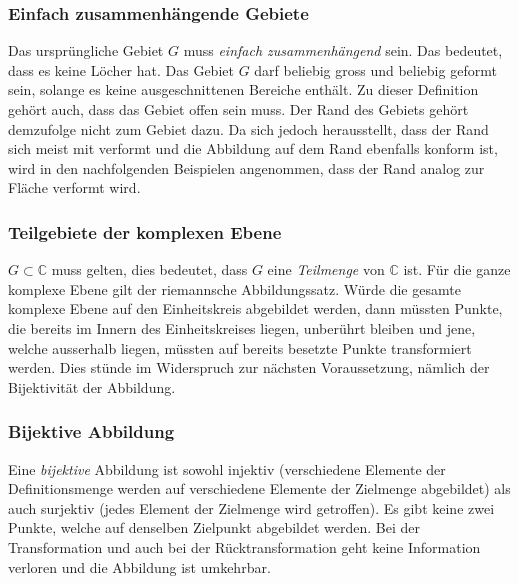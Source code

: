 \subsubsection{Einfach zusammenhängende Gebiete}
Das ursprüngliche Gebiet $G$ muss \emph{einfach zusammenhängend} sein. 
%
%
Das bedeutet, dass es keine Löcher hat.
Das Gebiet $G$ darf beliebig gross und beliebig geformt sein, solange es keine ausgeschnittenen Bereiche enthält.
Zu dieser Definition gehört auch, dass das Gebiet offen sein muss.
Der Rand des Gebiets gehört demzufolge nicht zum Gebiet dazu.
Da sich jedoch herausstellt, dass der Rand sich meist mit verformt und die Abbildung auf dem Rand ebenfalls konform ist, wird in den nachfolgenden Beispielen angenommen, dass der Rand analog zur Fläche verformt wird.


\subsubsection{Teilgebiete der komplexen Ebene}
$G \subset \mathbb{C}$ muss gelten, dies bedeutet, dass $G$ eine \emph{Teilmenge} von $\mathbb{C}$ ist.
Für die ganze komplexe Ebene gilt der riemannsche Abbildungssatz.
Würde die gesamte komplexe Ebene auf den Einheitskreis abgebildet werden, dann müssten Punkte, die bereits im Innern des Einheitskreises liegen, unberührt bleiben und jene, welche ausserhalb liegen, müssten auf bereits besetzte Punkte transformiert werden.
Dies stünde im Widerspruch zur nächsten Voraussetzung, nämlich der Bijektivität der Abbildung.

\subsubsection{Bijektive Abbildung}
Eine \emph{bijektive} Abbildung ist sowohl injektiv (verschiedene Elemente der Definitionsmenge werden auf verschiedene Elemente der Zielmenge abgebildet) als auch surjektiv (jedes Element der Zielmenge wird getroffen).
%
%
%
Es gibt keine zwei Punkte, welche auf denselben Zielpunkt abgebildet werden.
Bei der Transformation und auch bei der Rücktransformation geht keine Information verloren und die Abbildung ist umkehrbar.


